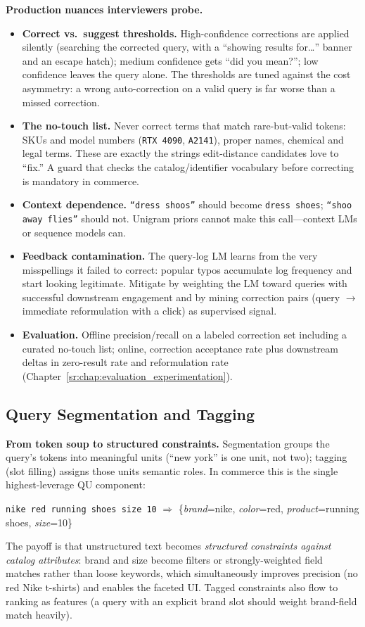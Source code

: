 \textbf{Production nuances interviewers probe.}
\begin{itemize}
    \item \textbf{Correct vs.\ suggest thresholds.} High-confidence corrections are applied silently (searching the corrected query, with a ``showing results for\ldots'' banner and an escape hatch); medium confidence gets ``did you mean?''; low confidence leaves the query alone. The thresholds are tuned against the cost asymmetry: a wrong auto-correction on a valid query is far worse than a missed correction.
    \item \textbf{The no-touch list.} Never correct terms that match rare-but-valid tokens: SKUs and model numbers (\texttt{RTX 4090}, \texttt{A2141}), proper names, chemical and legal terms. These are exactly the strings edit-distance candidates love to ``fix.'' A guard that checks the catalog/identifier vocabulary before correcting is mandatory in commerce.
    \item \textbf{Context dependence.} \texttt{``dress shoos''} should become \texttt{dress shoes}; \texttt{``shoo away flies''} should not. Unigram priors cannot make this call---context LMs or sequence models can.
    \item \textbf{Feedback contamination.} The query-log LM learns from the very misspellings it failed to correct: popular typos accumulate log frequency and start looking legitimate. Mitigate by weighting the LM toward queries with successful downstream engagement and by mining correction pairs (query $\to$ immediate reformulation with a click) as supervised signal.
    \item \textbf{Evaluation.} Offline precision/recall on a labeled correction set including a curated no-touch list; online, correction acceptance rate plus downstream deltas in zero-result rate and reformulation rate (Chapter~\ref{sr:chap:evaluation_experimentation}).
\end{itemize}

\subsection{Query Segmentation and Tagging}
\label{sr:sec:query_segmentation}

\textbf{From token soup to structured constraints.} Segmentation groups the query's tokens into meaningful units (``new york'' is one unit, not two); tagging (slot filling) assigns those units semantic roles. In commerce this is the single highest-leverage QU component:
\begin{center}
\texttt{nike red running shoes size 10} \quad$\Longrightarrow$\quad
\{\textit{brand}=nike, \textit{color}=red, \textit{product}=running shoes, \textit{size}=10\}
\end{center}
The payoff is that unstructured text becomes \textit{structured constraints against catalog attributes}: brand and size become filters or strongly-weighted field matches rather than loose keywords, which simultaneously improves precision (no red Nike t-shirts) and enables the faceted UI. Tagged constraints also flow to ranking as features (a query with an explicit brand slot should weight brand-field match heavily).


